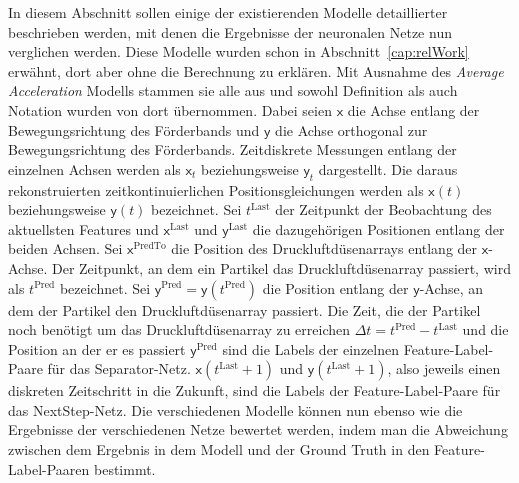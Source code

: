 
In diesem Abschnitt sollen einige der existierenden Modelle detaillierter beschrieben werden, mit denen die Ergebnisse der neuronalen Netze nun verglichen werden.
Diese Modelle wurden schon in Abschnitt~\ref{cap:relWork} erwähnt, dort aber ohne die Berechnung zu erklären.
Mit Ausnahme des \textit{Average Acceleration} Modells stammen sie alle aus \cite{Pfaff2018} und sowohl Definition als auch Notation wurden von dort übernommen.
Dabei seien \(\mathsf{x}\) die Achse entlang der Bewegungsrichtung des Förderbands und \(\mathsf{y}\) die Achse orthogonal zur Bewegungsrichtung des Förderbands.
Zeitdiskrete Messungen entlang der einzelnen Achsen werden als \(\mathsf{x}_t\) beziehungsweise \(\mathsf{y}_t\) dargestellt.
Die daraus rekonstruierten zeitkontinuierlichen Positionsgleichungen werden als \(\mathsf{x}(t)\) beziehungsweise \(\mathsf{y}(t)\) bezeichnet.
Sei \(t^{\text{Last}}\) der Zeitpunkt der Beobachtung des aktuellsten Features und \(\mathsf{x}^{\text{Last}}\) und \(\mathsf{y}^{\text{Last}}\) die dazugehörigen Positionen entlang der beiden Achsen.
Sei \(\mathsf{x}^{\text{PredTo}}\) die Position des Druckluftdüsenarrays entlang der \(\mathsf{x}\)-Achse.
Der Zeitpunkt, an dem ein Partikel das Druckluftdüsenarray passiert, wird als \(t^{\text{Pred}}\) bezeichnet.
Sei \(\mathsf{y}^{\text{Pred}} = \mathsf{y}(t^{\text{Pred}})\) die Position entlang der \(\mathsf{y}\)-Achse, an dem der Partikel den Druckluftdüsenarray passiert.
Die Zeit, die der Partikel noch benötigt um das Druckluftdüsenarray zu erreichen \(\Delta t = t^{\text{Pred}} - t^{\text{Last}} \) und die Position an der er es passiert \(\mathsf{y}^{\text{Pred}}\) sind die Labels der einzelnen Feature-Label-Paare für das Separator-Netz.
\(\mathsf{x}(t^{\text{Last}} + 1)\) und \(\mathsf{y}(t^{\text{Last}} + 1)\), also jeweils einen diskreten Zeitschritt in die Zukunft, sind die Labels der Feature-Label-Paare für das NextStep-Netz.
Die verschiedenen Modelle können nun ebenso wie die Ergebnisse der verschiedenen Netze bewertet werden, 
indem man die Abweichung zwischen dem Ergebnis in dem Modell und der Ground Truth in den Feature-Label-Paaren bestimmt.


